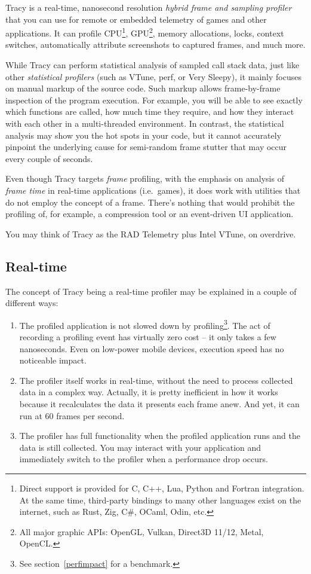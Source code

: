 \documentclass[hidelinks,titlepage,a4paper,twoside]{article}
\begin{document}
Tracy is a real-time, nanosecond resolution \emph{hybrid frame and sampling profiler} that you can use for remote or embedded telemetry of games and other applications. It can profile CPU\footnote{Direct support is provided for C, C++, Lua, Python and Fortran integration. At the same time, third-party bindings to many other languages exist on the internet, such as Rust, Zig, C\#, OCaml, Odin, etc.}, GPU\footnote{All major graphic APIs: OpenGL, Vulkan, Direct3D 11/12, Metal, OpenCL.}, memory allocations, locks, context switches, automatically attribute screenshots to captured frames, and much more.

While Tracy can perform statistical analysis of sampled call stack data, just like other \emph{statistical profilers} (such as VTune, perf, or Very Sleepy), it mainly focuses on manual markup of the source code. Such markup allows frame-by-frame inspection of the program execution. For example, you will be able to see exactly which functions are called, how much time they require, and how they interact with each other in a multi-threaded environment. In contrast, the statistical analysis may show you the hot spots in your code, but it cannot accurately pinpoint the underlying cause for semi-random frame stutter that may occur every couple of seconds.

Even though Tracy targets \emph{frame} profiling, with the emphasis on analysis of \emph{frame time} in real-time applications (i.e.~games), it does work with utilities that do not employ the concept of a frame. There's nothing that would prohibit the profiling of, for example, a compression tool or an event-driven UI application.

You may think of Tracy as the RAD Telemetry plus Intel VTune, on overdrive.

\subsection{Real-time}

The concept of Tracy being a real-time profiler may be explained in a couple of different ways:

\begin{enumerate}
\item The profiled application is not slowed down by profiling\footnote{See section~\ref{perfimpact} for a benchmark.}. The act of recording a profiling event has virtually zero cost -- it only takes a few nanoseconds. Even on low-power mobile devices, execution speed has no noticeable impact.
\item The profiler itself works in real-time, without the need to process collected data in a complex way. Actually, it is pretty inefficient in how it works because it recalculates the data it presents each frame anew. And yet, it can run at 60 frames per second.
\item The profiler has full functionality when the profiled application runs and the data is still collected. You may interact with your application and immediately switch to the profiler when a performance drop occurs.
\end{enumerate}
\end{document}
